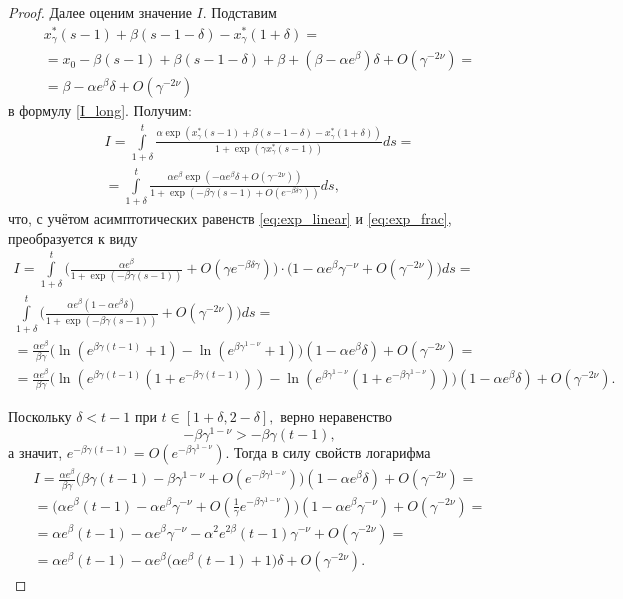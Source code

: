 \begin{proof}
Далее оценим значение $I$. Подставим
%
\begin{multline*}
x^*_{\gamma}(s - 1) + \beta (s - 1 - \delta) - x^*_{\gamma} (1 + \delta) =\\
= x_0 - \beta(s - 1) + \beta(s - 1 - \delta) + \beta + (\beta - \alpha e^{\beta}) \delta + O(\gamma^{-2\nu}) =\\
= \beta - \alpha e^{\beta} \delta + O(\gamma^{-2\nu})
\end{multline*}
%
в формулу \eqref{I_long}. Получим:
\begin{multline*}
	I=\int\limits_{1+\delta}^{t}\frac{\alpha\exp(x_\gamma^*(s-1)+\beta(s-1-\delta)-x_\gamma^*(1+\delta))}{1+\exp(\gamma x_\gamma^*(s-1))} ds =\\
	=\int\limits_{1+\delta}^{t}\frac{\alpha e^{\beta}\exp(-\alpha e^\beta\delta+O(\gamma^{-2\nu}))}{1+\exp( -\beta\gamma (s-1)+O(e^{-\beta\delta\gamma}))} ds,
\end{multline*}
%
что, с учётом асимптотических равенств \eqref{eq:exp_linear} и \eqref{eq:exp_frac}, преобразуется к виду
\begin{multline*}
	I = \int\limits_{1 + \delta}^{t}\Big(\frac{\alpha e^\beta}{1 + \exp(-\beta\gamma(s-1))} + O(\gamma e^{-\beta\delta\gamma})\Big) \cdot \big(1-\alpha e^{\beta} \gamma^{-\nu} + O(\gamma^{-2\nu})\big)ds=\\
	\int\limits_{1+\delta}^{t}\Big(\frac{\alpha e^\beta(1-\alpha e^{\beta}\delta)}{1 + \exp(-\beta\gamma(s-1))} + O(\gamma^{-2\nu})\Big)ds=\\
	= \frac{\alpha e^{\beta}}{\beta\gamma}\big(\ln(e^{\beta\gamma(t - 1)} + 1) - \ln(e^{\beta\gamma^{1-\nu}}+1)\big)(1-\alpha e^{\beta}\delta)+O(\gamma^{-2\nu})=\\
	= \frac{\alpha e^{\beta}}{\beta\gamma}\big(\ln(e^{\beta\gamma(t-1)}(1 + e^{-\beta\gamma(t - 1)})) - \ln(e^{\beta\gamma^{1 - \nu}}(1 + e^{-\beta\gamma^{1-\nu}}))\big)(1-\alpha e^{\beta}\delta)+O(\gamma^{-2\nu}).
\end{multline*}
	
Поскольку $\delta < t - 1$ при $t \in [1 + \delta, 2 - \delta],$ верно неравенство
%
\[-\beta \gamma^{1 - \nu} > - \beta \gamma (t - 1),\]
%
а значит, $e^{-\beta \gamma (t - 1)} = O(e^{-\beta\gamma^{1 - \nu}})$.
Тогда в силу свойств логарифма
%
\begin{multline}
	\label{eq:I_step3}
	I=\frac{\alpha e^{\beta}}{\beta\gamma}\big(\beta\gamma(t-1)-\beta\gamma^{1-\nu}+O(e^{-\beta\gamma^{1-\nu}})\big)(1-\alpha e^{\beta}\delta)+O(\gamma^{-2\nu})=\\
	= \big(\alpha e^{\beta}(t-1)-\alpha e^{\beta}\gamma^{-\nu} + O(\frac{1}{\gamma} e^{-\beta\gamma^{1-\nu}})\big)(1-\alpha e^{\beta}\gamma^{-\nu})+O(\gamma^{-2\nu})=\\
	= \alpha e^{\beta}(t-1)-\alpha e^{\beta}\gamma^{-\nu}-\alpha^2 e^{2\beta}(t-1)\gamma^{-\nu}+O(\gamma^{-2\nu})=\\
	= \alpha e^{\beta}(t-1)-\alpha e^{\beta}\big(\alpha e^{\beta}(t-1)+1\big)\delta+O(\gamma^{-2\nu}).
\end{multline}



\end{proof}
